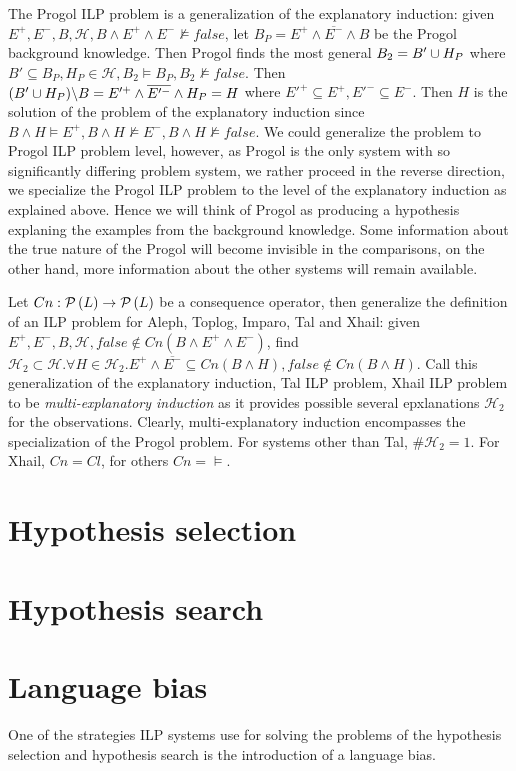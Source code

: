 The Progol ILP problem is a generalization of the explanatory induction: given $E^{+}, E^{-}, B, \mathcal{H}, B \land E^{+} \land E^{-} \not\models false$,
let $B_P=E^{+} \land \overline{E^{-}} \land B$ be the Progol background knowledge. Then Progol finds the most general $B_2 = B' \cup H_P$ where $B' \subseteq B_P, H_P \in \mathcal{H}, B_2 \models B_P, B_2 \not\models false$.
Then $(B' \cup H_P) \backslash B=E'^{+} \land \overline{E'^-} \land H_P = H$ where $E'^+ \subseteq E^+, E'^- \subseteq E^-$. Then $H$ is the solution of the problem of the explanatory induction since $B \land H \models E^{+}, B \land H \not\models E^{-}, B \land H \not\models false$. We could generalize the problem to Progol ILP problem level, however, as Progol is the only system with so significantly differing problem system, we rather proceed in the reverse direction, we specialize the Progol ILP problem to the level of the explanatory induction as explained above. Hence we will think of Progol as producing a hypothesis explaning the examples from the background knowledge. Some information about the true nature of the Progol will become invisible in the comparisons, on the other hand, more information about the other systems will remain available.

Let $Cn:\mathcal{P} \left({ L }\right) \to \mathcal{P} \left({ L }\right)$ be a consequence operator, then generalize the definition of an ILP problem for Aleph, Toplog, Imparo, Tal and Xhail:
given $E^{+}, E^{-}, B, \mathcal{H}, false \not\in Cn(B \land E^{+} \land E^{-})$,
find $\mathcal{H}_2 \subset \mathcal{H}. \forall H \in \mathcal{H}_2. E^{+} \land \overline{E^{-}} \subseteq Cn(B \land H), false \not\in Cn(B \land H)$. Call this generalization of the explanatory induction, Tal ILP problem, Xhail ILP problem to be \emph{multi-explanatory induction} as it provides possible several epxlanations $\mathcal{H}_2$ for the observations. Clearly, multi-explanatory induction encompasses the specialization of the Progol problem. For systems other than Tal, $\#\mathcal{H}_2=1$. For Xhail, $Cn=Cl$, for others $Cn=\models$.

\section{Hypothesis selection}

\section{Hypothesis search}

\section{Language bias}
One of the strategies ILP systems use for solving the problems of the hypothesis selection and hypothesis search is the introduction of a language bias.

